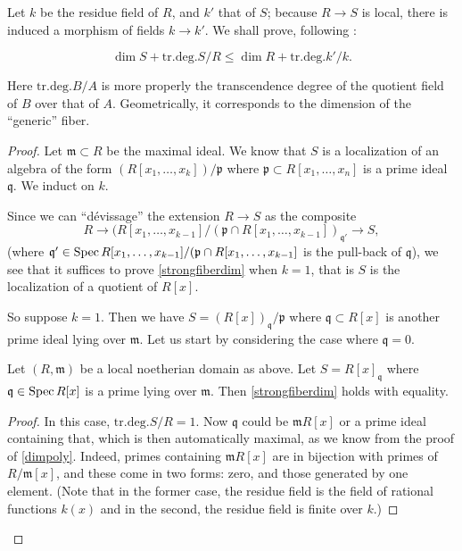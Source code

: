 Let $k$ be the residue field of $R$, and $k'$ that of $S$; because $R \to S$ is
local, there is induced a morphism of fields $k \to k'$. 
We shall prove, following \cite{EGA}:
\newcommand{\trdeg}{\mathrm{tr.deg.}}
\begin{theorem}
\begin{equation}\label{strongfiberdim} \dim S + \trdeg S/R \leq \dim R + \trdeg
k'/k.  \end{equation}
\end{theorem} 
Here $\trdeg B/A$ is more properly the transcendence degree of the quotient
field of $B$ over that of $A$.
Geometrically, it corresponds to the dimension of the ``generic'' fiber. 

\begin{proof} Let $\mathfrak{m} \subset R$ be the maximal ideal.
We know that $S$ is a localization of an algebra of the form
$(R[x_1, \dots, x_k])/\mathfrak{p}$ where $\mathfrak{p} \subset R[x_1, \dots,
x_n]$ is a prime ideal $\mathfrak{q}$.
We induct on $k$.

Since we can ``d\'evissage'' the extension $R \to S$ as the
composite
\[ R \to (R[x_1, \dots, x_{k-1}]/(\mathfrak{p} \cap R[x_1, \dots,
x_{k-1}])_{\mathfrak{q'}}  \to S, \]
(where $\mathfrak{q}' \in \operatorname{Spec} R[x_1, \dots, x_{k-1}]/(\mathfrak{p} \cap R[x_1, \dots,
x_{k-1}]$ is the pull-back of $\mathfrak{q}$),
we see that it suffices to prove \eqref{strongfiberdim} when $k=1$, that is $S$
is the localization of a quotient of $R[x]$.

So suppose $k=1$. Then we have $S = (R[x])_{\mathfrak{q}}/\mathfrak{p}$ where
$\mathfrak{q} \subset R[x]$ is another prime ideal lying over $\mathfrak{m}$.
Let us start by considering the case where $\mathfrak{q} = 0$.

\begin{lemma} Let $(R, \mathfrak{m})$ be a local noetherian domain as above.
Let $S = R[x]_{\mathfrak{q}}$ where $\mathfrak{q} \in \operatorname{Spec} R[x]$ is a prime
lying over $\mathfrak{m}$. Then \eqref{strongfiberdim} holds with equality.
\end{lemma} 
\begin{proof}
In this case, $\trdeg S/R = 1$. Now $\mathfrak{q}$
could be $\mathfrak{m} R[x]$ or a prime ideal containing that, which is then
automatically
maximal, as we know from the proof of \cref{dimpoly}. Indeed, primes
containing $\mathfrak{m}R[x]$ are
in bijection with primes of $R/\mathfrak{m}[x]$, and these come in two forms:
zero, and those generated by one element. (Note that in the former case, the
residue field is the field of rational functions $k(x)$ and in the second, the residue field is finite over
$k$.)


\end{proof}
\end{proof}
